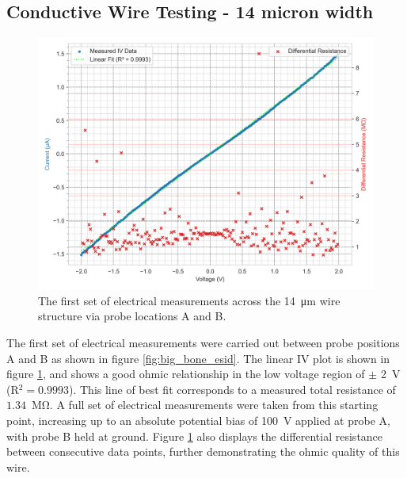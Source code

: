 \begin{refsection}
\subsection{Conductive Wire Testing - 14 micron width}
\label{subsubsec:graphitised_wire_testing_14}
\begin{figure}[H]
    \centering
    \includegraphics[width=\linewidth]{Chapter7/Figs/Raster/2V AB d.png}
    \caption{The first set of electrical measurements across the 14~\si{\micro\metre} wire structure via probe locations A and B.}
    \label{fig:2v_ab}
\end{figure}
The first set of electrical measurements were carried out between probe positions A and B as shown in figure \ref{fig:big_bone_esid}. The linear IV plot is shown in figure \ref{fig:2v_ab}, and shows a good ohmic relationship in the low voltage region of $\pm$ 2~\si{\volt} (R$^{2} = 0.9993$). This line of best fit corresponds to a measured total resistance of $1.34$~\si{\mega\ohm}. A full set of electrical measurements were taken from this starting point, increasing up to an absolute potential bias of 100~\si{\volt} applied at probe A, with probe B held at ground. Figure \ref{fig:2v_ab} also displays the differential resistance between consecutive data points, further demonstrating the ohmic quality of this wire.


\end{refsection}
